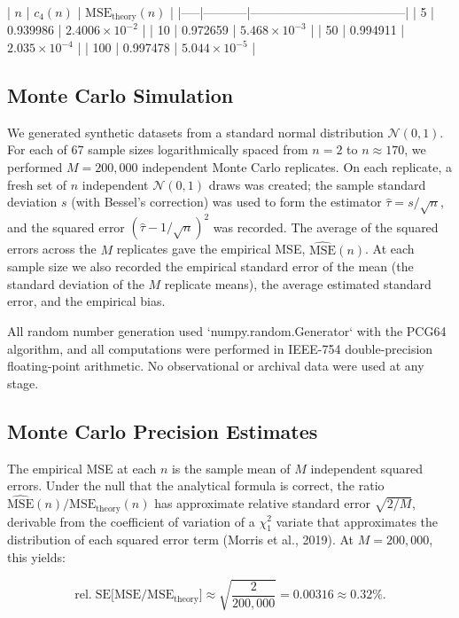 \documentclass[11pt]{article}
\begin{document}
| $n$ | $c_4(n)$ | $\mathrm{MSE}_{\mathrm{theory}}(n)$ |
|-----|-----------|--------------------------------------|
| 5 | 0.939986 | $2.4006 \times 10^{-2}$ |
| 10 | 0.972659 | $5.468 \times 10^{-3}$ |
| 50 | 0.994911 | $2.035 \times 10^{-4}$ |
| 100 | 0.997478 | $5.044 \times 10^{-5}$ |

\subsection{Monte Carlo Simulation}

We generated synthetic datasets from a standard normal distribution $\mathcal{N}(0,1)$. For each of 67 sample sizes logarithmically spaced from $n = 2$ to $n \approx 170$, we performed $M = 200{,}000$ independent Monte Carlo replicates. On each replicate, a fresh set of $n$ independent $\mathcal{N}(0,1)$ draws was created; the sample standard deviation $s$ (with Bessel's correction) was used to form the estimator $\hat{\tau} = s/\sqrt{n}$, and the squared error $(\hat{\tau} - 1/\sqrt{n})^2$ was recorded. The average of the squared errors across the $M$ replicates gave the empirical MSE, $\widehat{\mathrm{MSE}}(n)$. At each sample size we also recorded the empirical standard error of the mean (the standard deviation of the $M$ replicate means), the average estimated standard error, and the empirical bias.

All random number generation used `numpy.random.Generator` with the PCG64 algorithm, and all computations were performed in IEEE-754 double-precision floating-point arithmetic. No observational or archival data were used at any stage.

\subsection{Monte Carlo Precision Estimates}

The empirical MSE at each $n$ is the sample mean of $M$ independent squared errors. Under the null that the analytical formula is correct, the ratio $\widehat{\mathrm{MSE}}(n)/\mathrm{MSE}_{\mathrm{theory}}(n)$ has approximate relative standard error $\sqrt{2/M}$, derivable from the coefficient of variation of a $\chi^2_1$ variate that approximates the distribution of each squared error term (Morris et al., 2019). At $M = 200{,}000$, this yields:

$$\mathrm{rel.\;SE}\bigl[\widehat{\mathrm{MSE}}/\mathrm{MSE}_{\mathrm{theory}}\bigr] \approx \sqrt{\frac{2}{200{,}000}} = 0.00316 \approx 0.32\%.$$
\end{document}
